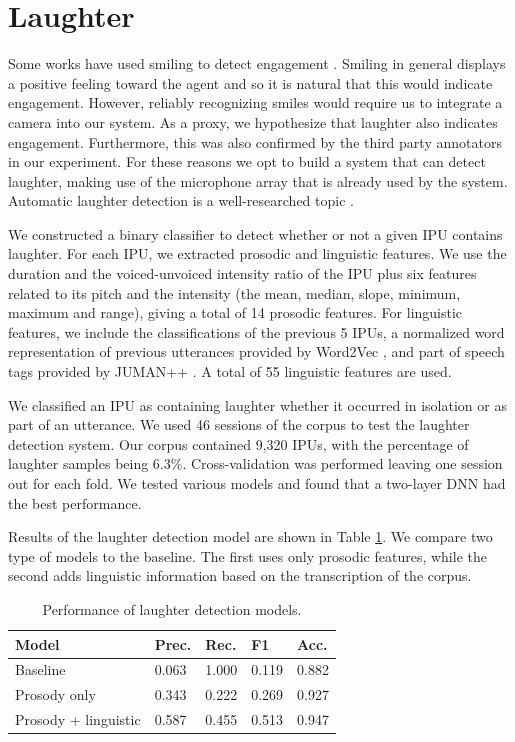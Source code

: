 \documentclass[letterpaper]{article} %
\begin{document}
\section{Laughter}
Some works have used smiling to detect engagement \cite{Castellano2009,Yu2017}. Smiling in general displays a positive feeling toward the agent and so it is natural that this would indicate engagement. However, reliably recognizing smiles would require us to integrate a camera into our system. As a proxy, we hypothesize that laughter also indicates engagement. Furthermore, this was also confirmed by the third party annotators in our experiment. For these reasons we opt to build a system that can detect laughter, making use of the microphone array that is already used by the system. Automatic laughter detection is a well-researched topic \cite{Cosentino2016}.

We constructed a binary classifier to detect whether or not a given IPU contains laughter. For each IPU, we extracted prosodic and linguistic features. We use the duration and the voiced-unvoiced intensity ratio of the IPU plus six features related to its pitch and the intensity (the mean, median, slope, minimum, maximum and range), giving a total of 14 prosodic features. For linguistic features, we include the classifications of the previous 5 IPUs, a normalized word representation of previous utterances provided by Word2Vec \cite{Mikolov2013}, and part of speech tags provided by JUMAN++ \cite{Morita2015}. A total of 55 linguistic features are used.

We classified an IPU as containing laughter whether it occurred in isolation or as part of an utterance. We used 46 sessions of the corpus to test the laughter detection system. Our corpus contained 9,320 IPUs, with the percentage of laughter samples being 6.3\%. Cross-validation was performed leaving one session out for each fold. We tested various models and found that a two-layer DNN had the best performance.

Results of the laughter detection model are shown in Table \ref{laughresults}. We compare two type of models to the baseline. The first uses only prosodic features, while the second adds linguistic information based on the transcription of the corpus.

\begin{table}[h]
\begin{center}
\begin{tabular}{|l|l|l|l|l|}
\hline \bf Model & \bf Prec. & \bf Rec. & \bf F1 & \bf Acc. \\ \hline
Baseline & 0.063 & 1.000 & 0.119 & 0.882 \\
Prosody only & 0.343 & 0.222 & 0.269 &  0.927 \\
Prosody + linguistic & 0.587 & 0.455 & 0.513 & 0.947 \\
\hline
\end{tabular}
\end{center}
\caption{\label{laughresults} Performance of laughter detection models.}
\end{table}
\end{document}
